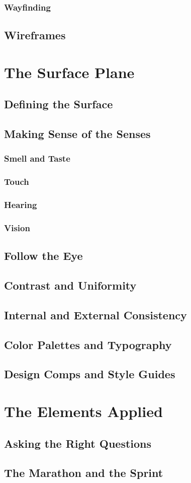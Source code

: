 \documentclass{book}
\begin{document}
            \subsection{Wayfinding}
        \section{Wireframes}
    \chapter{The Surface Plane}
        \section{Defining the Surface}
        \section{Making Sense of the Senses}
            \subsection{Smell and Taste}
            \subsection{Touch}
            \subsection{Hearing}
            \subsection{Vision}
        \section{Follow the Eye}
        \section{Contrast and Uniformity}
        \section{Internal and External Consistency}
        \section{Color Palettes and Typography}
        \section{Design Comps and Style Guides}
    \chapter{The Elements Applied}
        \section{Asking the Right Questions}
        \section{The Marathon and the Sprint}
\end{document}
